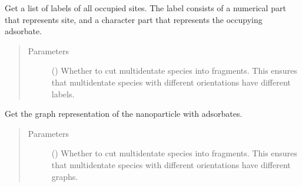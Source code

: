 \documentclass[letterpaper,10pt,english]{sphinxmanual}
\begin{document}
\begin{fulllineitems}
\begin{fulllineitems}
\end{fulllineitems}


\begin{fulllineitems}
\label{\detokenize{modules:acat.adsorbate_coverage.ClusterAdsorbateCoverage.get_occupied_labels}}
Get a list of labels of all occupied sites. The label consists
of a numerical part that represents site, and a character part
that represents the occupying adsorbate.
\begin{quote}\begin{description}
\item[{Parameters}] \leavevmode
{} (\sphinxstyleliteralemphasis{\sphinxupquote{, }}) \textendash{} Whether to cut multidentate species into fragments. This ensures
that multidentate species with different orientations have
different labels.

\end{description}\end{quote}

\end{fulllineitems}


\begin{fulllineitems}
\label{\detokenize{modules:acat.adsorbate_coverage.ClusterAdsorbateCoverage.get_graph}}
Get the graph representation of the nanoparticle with adsorbates.
\begin{quote}\begin{description}
\item[{Parameters}] \leavevmode
{} (\sphinxstyleliteralemphasis{\sphinxupquote{, }}) \textendash{} Whether to cut multidentate species into fragments. This ensures
that multidentate species with different orientations have
different graphs.


\end{description}
\end{quote}
\end{fulllineitems}
\end{fulllineitems}
\end{document}
